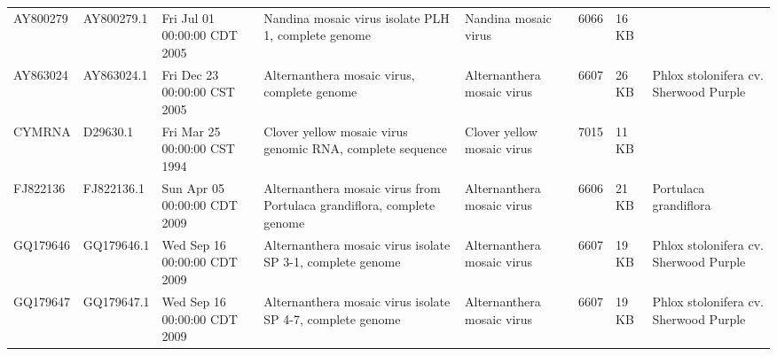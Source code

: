 \documentclass[11pt]{article}
\begin{document}
\begin{supptable}[ht]
{\begin{tabular}{@{}llllllll@{}}
AY800279 & AY800279.1 & Fri Jul 01 00:00:00 CDT 2005 & Nandina mosaic virus isolate PLH 1, complete genome                                                                                                                                                                                                              & Nandina mosaic virus           & 6066            & 16 KB &                                       \\
AY863024 & AY863024.1 & Fri Dec 23 00:00:00 CST 2005 & Alternanthera mosaic virus, complete genome                                                                                                                                                                                                                      & Alternanthera mosaic virus     & 6607            & 26 KB & Phlox stolonifera cv. Sherwood Purple \\
CYMRNA   & D29630.1   & Fri Mar 25 00:00:00 CST 1994 & Clover yellow mosaic virus genomic RNA, complete sequence                                                                                                                                                                                                        & Clover yellow mosaic virus     & 7015            & 11 KB &                                       \\
FJ822136 & FJ822136.1 & Sun Apr 05 00:00:00 CDT 2009 & Alternanthera mosaic virus from Portulaca grandiflora, complete genome                                                                                                                                                                                           & Alternanthera mosaic virus     & 6606            & 21 KB & Portulaca grandiflora                 \\
GQ179646 & GQ179646.1 & Wed Sep 16 00:00:00 CDT 2009 & Alternanthera mosaic virus isolate SP 3-1, complete genome                                                                                                                                                                                                       & Alternanthera mosaic virus     & 6607            & 19 KB & Phlox stolonifera cv. Sherwood Purple \\
GQ179647 & GQ179647.1 & Wed Sep 16 00:00:00 CDT 2009 & Alternanthera mosaic virus isolate SP 4-7, complete genome                                                                                                                                                                                                       & Alternanthera mosaic virus     & 6607            & 19 KB & Phlox stolonifera cv. Sherwood Purple \\

\end{tabular}}
\end{supptable}
\end{document}
